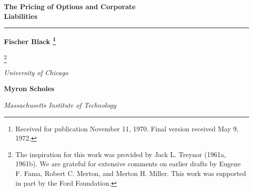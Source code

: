 \documentclass[a4paper, 12pt, twoside]{article}
\newcommand\blfootnote[1]{%
  \begingroup
  \renewcommand{\thefootnote}{}
  \footnote{#1}%
  \addtocounter{footnote}{-1}%
  \endgroup
}
\renewenvironment{abstract}
 {\linespread{1.15}\fontsize{10}{10}\selectfont
  \list{}{
    \setlength{\leftmargin}{0.9cm}%
    \setlength{\rightmargin}{\leftmargin}%
  }%
  \item\relax}
 {\endlist}
\begin{document}
\setlength{\abovedisplayskip}{1pt}  %
\setlength{\belowdisplayskip}{1pt}  %
\thispagestyle{plain}
\begingroup 
\linespread{1.5}\fontsize{18}{18}\bfseries\selectfont
\noindent The Pricing of Options and Corporate \\
Liabilities \par
\endgroup 

\vspace{20mm}

\hrule 

\vspace{5mm}

\begingroup 
\linespread{1.5}\fontsize{14}{14}\bfseries\selectfont
\noindent Fischer Black \blfootnote{\linespread{1}\fontsize{10}{10}\selectfont Received for publication November 11, 1970. Final version received May 9, 1972.} \blfootnote{\linespread{1}\fontsize{10}{10}\selectfont The inspiration for this work was provided by Jack L. Treynor (1961a, 1961b). We are grateful for extensive comments on earlier drafts by Eugene F. Fama, Robert C. Merton, and Merton H. Miller. This work was supported in part by the Ford Foundation.} \par
\endgroup 

\vspace{1mm}

\begingroup 
\linespread{1.5}\fontsize{8}{8}\selectfont
\noindent \textit{University of Chicago} \par
\endgroup 

\vspace{2mm}

\begingroup 
\linespread{1.5}\fontsize{14}{14}\bfseries\selectfont
\noindent Myron Scholes \par
\endgroup 

\vspace{1mm}

\begingroup 
\linespread{1.5}\fontsize{8}{8}\selectfont
\noindent \textit{Massachusetts Institute of Technology} \par
\endgroup 

\vspace{8mm}

\begin{abstract}

\end{abstract}

\vspace{2mm}

\linespread{1.15}\selectfont 
\end{document}
